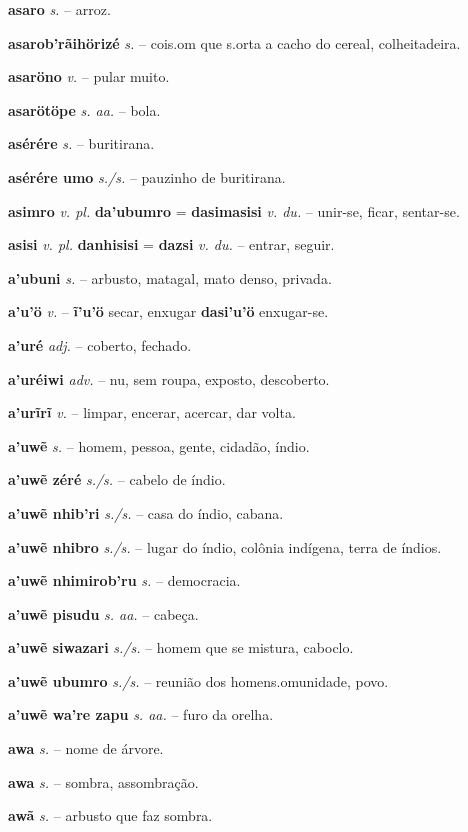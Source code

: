 \textbf{asaro} \textit{s.} -- arroz.

\textbf{asarob'rãihörizé} \textit{s.} -- cois.om que s.orta a cacho do cereal, colheitadeira.

\textbf{asaröno} \textit{v.} -- pular muito.

\textbf{asarötöpe} \textit{s. aa.} -- bola.

\textbf{asérére} \textit{s.} -- buritirana.

\textbf{asérére umo} \textit{s./s.} -- pauzinho de buritirana.

\textbf{asimro} \textit{v. pl.} \textbf{da'ubumro} = \textbf{dasimasisi} \textit{v. du.} -- unir-se, ficar, sentar-se.

\textbf{asisi} \textit{v. pl.} \textbf{danhisisi} = \textbf{dazsi} \textit{v. du.} -- entrar, seguir.

\textbf{a'ubuni} \textit{s.} -- arbusto, matagal, mato denso, privada.

\textbf{a'u'ö} \textit{v.} -- \textbf{ĩ'u'ö} secar, enxugar  \textbf{dasi'u'ö} enxugar-se.

\textbf{a'uré} \textit{adj.} -- coberto, fechado.

\textbf{a'uréiwi} \textit{adv.} -- nu, sem roupa, exposto, descoberto.

\textbf{a'urĩrĩ} \textit{v.} -- limpar, encerar, acercar, dar volta.

\textbf{a'uwẽ} \textit{s.} -- homem, pessoa, gente, cidadão, índio.

\textbf{a'uwẽ zéré} \textit{s./s.} -- cabelo de índio.

\textbf{a'uwẽ nhib'ri} \textit{s./s.} -- casa do índio, cabana.

\textbf{a'uwẽ nhibro} \textit{s./s.} -- lugar do índio, colônia indígena, terra de índios.

\textbf{a'uwẽ nhimirob'ru} \textit{s.} -- democracia.

\textbf{a'uwẽ pisudu} \textit{s. aa.} -- cabeça.

\textbf{a'uwẽ siwazari} \textit{s./s.} -- homem que se mistura, caboclo.

\textbf{a'uwẽ ubumro} \textit{s./s.} -- reunião dos homens.omunidade, povo.

\textbf{a'uwẽ wa're zapu} \textit{s. aa.} -- furo da orelha.

\textbf{awa} \textit{s.} -- nome de árvore.

\textbf{awa} \textit{s.} -- sombra, assombração.

\textbf{awã} \textit{s.} -- arbusto que faz sombra.

